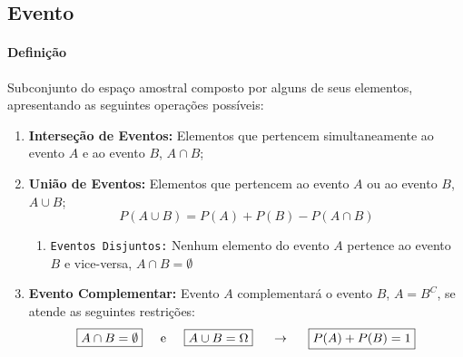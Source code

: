\documentclass{article}
\begin{document}
        \subsection{Evento}
            \paragraph{Definição}Subconjunto do espaço amostral composto por alguns de seus elementos, apresentando as seguintes operações possíveis:
                \begin{enumerate}[noitemsep]
                    \item \textbf{Interseção de Eventos:} Elementos que pertencem simultaneamente ao evento $A$ e ao evento $B$, $A \cap B$;
                    \item \textbf{União de Eventos:} Elementos que pertencem ao evento $A$ ou ao evento $B$, $A \cup B$;
                        \begin{equation}
                            \boxed{
                                P(A \cup B) = P(A) + P(B) - P(A \cap B)
                            }
                        \end{equation}

                        \begin{enumerate}[noitemsep]
                            \item \texttt{Eventos Disjuntos:} Nenhum elemento do evento $A$ pertence ao evento $B$ e vice-versa, $A \cap B = \emptyset$
                        \end{enumerate}
                    \item \textbf{Evento Complementar:} Evento $A$ complementará o evento $B$, $A = B^{C}$, se atende as seguintes restrições:
                        \begin{equation}
                            \boxed{
                                A \cap B = \emptyset
                            }
                            \hspace{5mm}
                            \text{e}
                            \hspace{5mm}
                            \boxed{
                                A \cup B = \Omega
                            }
                            \hspace{5mm}
                            \to
                            \hspace{5mm}
                            \boxed{
                                P(A) + P(B) = 1
                            }
                        \end{equation}
                \end{enumerate}
\end{document}
